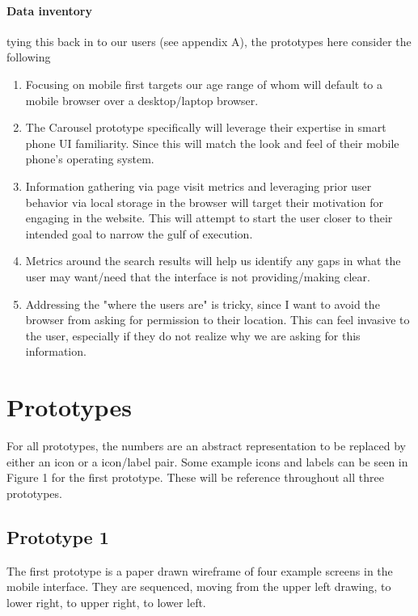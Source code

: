 \paragraph{Data inventory} tying this back in to our users (see appendix A), the prototypes here consider the following

\begin{enumerate}
\item
  Focusing on mobile first targets our age range of whom will default to a mobile browser over a desktop/laptop browser.
\item
  The Carousel prototype specifically will leverage their expertise in smart phone UI familiarity. Since this will match the look and feel of their mobile phone's operating system.
\item
  Information gathering via page visit metrics and leveraging prior user behavior via local storage in the browser will target their motivation for engaging in the website. This will attempt to start the user closer to their intended goal to narrow the gulf of execution.
\item
  Metrics around the search results will help us identify any gaps in what the user may want/need that the interface is not providing/making clear.
\item
  Addressing the "where the users are" is tricky, since I want to avoid the browser from asking for permission to their location. This can feel invasive to the user, especially if they do not realize why we are asking for this information.
\end{enumerate}

\section{Prototypes}

For all prototypes, the numbers are an abstract representation to be replaced by either an icon or a icon/label pair. Some example icons and labels can be seen in Figure 1 for the first prototype. These will be reference throughout all three prototypes.

\subsection{Prototype 1}
The first prototype is a paper drawn wireframe of four example screens in the mobile interface. They are sequenced, moving from the upper left drawing, to lower right, to upper right, to lower left.

